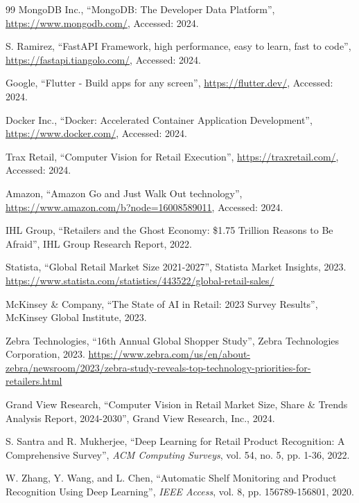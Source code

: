 \documentclass[12pt,a4paper]{report}
\begin{document}
\begin{thebibliography}{99}
    MongoDB Inc., ``MongoDB: The Developer Data Platform'', \url{https://www.mongodb.com/}, Accessed: 2024.
    
    S. Ramirez, ``FastAPI Framework, high performance, easy to learn, fast to code'', \url{https://fastapi.tiangolo.com/}, Accessed: 2024.
    
    Google, ``Flutter - Build apps for any screen'', \url{https://flutter.dev/}, Accessed: 2024.
    
    Docker Inc., ``Docker: Accelerated Container Application Development'', \url{https://www.docker.com/}, Accessed: 2024.
    
    Trax Retail, ``Computer Vision for Retail Execution'', \url{https://traxretail.com/}, Accessed: 2024.
    
    Amazon, ``Amazon Go and Just Walk Out technology'', \url{https://www.amazon.com/b?node=16008589011}, Accessed: 2024.
    
    IHL Group, ``Retailers and the Ghost Economy: \$1.75 Trillion Reasons to Be Afraid'', IHL Group Research Report, 2022.
    
    Statista, ``Global Retail Market Size 2021-2027'', Statista Market Insights, 2023. \url{https://www.statista.com/statistics/443522/global-retail-sales/}
    
    McKinsey \& Company, ``The State of AI in Retail: 2023 Survey Results'', McKinsey Global Institute, 2023.
    
    Zebra Technologies, ``16th Annual Global Shopper Study'', Zebra Technologies Corporation, 2023. \url{https://www.zebra.com/us/en/about-zebra/newsroom/2023/zebra-study-reveals-top-technology-priorities-for-retailers.html}
    
    Grand View Research, ``Computer Vision in Retail Market Size, Share \& Trends Analysis Report, 2024-2030'', Grand View Research, Inc., 2024.
    
    
    S. Santra and R. Mukherjee, ``Deep Learning for Retail Product Recognition: A Comprehensive Survey'', \textit{ACM Computing Surveys}, vol. 54, no. 5, pp. 1-36, 2022.
    
    W. Zhang, Y. Wang, and L. Chen, ``Automatic Shelf Monitoring and Product Recognition Using Deep Learning'', \textit{IEEE Access}, vol. 8, pp. 156789-156801, 2020.
    

\end{thebibliography}
\end{document}
